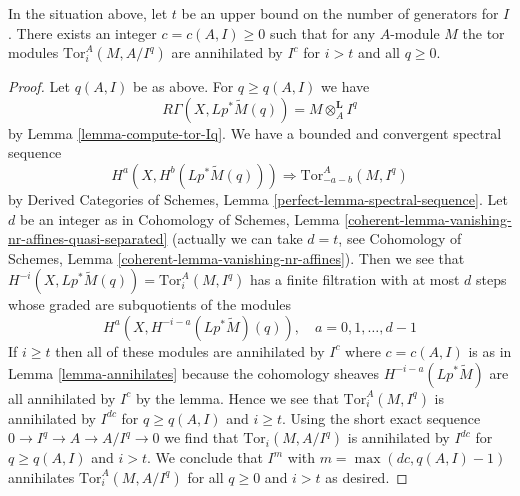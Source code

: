\begin{lemma}
\label{lemma-annihilates-tors}
In the situation above, let $t$ be an upper bound on the number of
generators for $I$. There exists an integer $c = c(A, I) \geq 0$
such that for any $A$-module $M$ the tor modules
$\text{Tor}_i^A(M, A/I^q)$ are annihilated by $I^c$ for $i > t$
and all $q \geq 0$.
\end{lemma}

\begin{proof}
Let $q(A, I)$ be as above. For $q \geq q(A, I)$ we have
$$
R\Gamma(X, Lp^*\widetilde{M}(q)) = M \otimes_A^\mathbf{L} I^q
$$
by Lemma \ref{lemma-compute-tor-Iq}.
We have a bounded and convergent spectral sequence
$$
H^a(X, H^b(Lp^*\widetilde{M}(q))) \Rightarrow
\text{Tor}_{-a - b}^A(M, I^q)
$$
by Derived Categories of Schemes, Lemma \ref{perfect-lemma-spectral-sequence}.
Let $d$ be an integer as in Cohomology of Schemes, Lemma
\ref{coherent-lemma-vanishing-nr-affines-quasi-separated}
(actually we can take $d = t$, see
Cohomology of Schemes, Lemma \ref{coherent-lemma-vanishing-nr-affines}).
Then we see that $H^{-i}(X, Lp^*\widetilde{M}(q)) = \text{Tor}_i^A(M, I^q)$
has a finite filtration with at most $d$ steps whose graded are
subquotients of the modules
$$
H^a(X, H^{- i - a}(Lp^*\widetilde{M})(q)),\quad
a = 0, 1, \ldots, d - 1
$$
If $i \geq t$ then all of these modules are annihilated
by $I^c$ where $c = c(A, I)$ is as in Lemma \ref{lemma-annihilates}
because the cohomology sheaves $H^{- i - a}(Lp^*\widetilde{M})$
are all annihilated by $I^c$ by the lemma. Hence we see that
$\text{Tor}_i^A(M, I^q)$ is annihilated by $I^{dc}$ for
$q \geq q(A, I)$ and $i \geq t$. Using the short exact sequence
$0 \to I^q \to A \to A/I^q \to 0$ we find that
$\text{Tor}_i(M, A/I^q)$ is annihilated by $I^{dc}$ for $q \geq q(A, I)$
and $i > t$. We conclude that $I^m$ with $m = \max(dc, q(A, I) - 1)$
annihilates $\text{Tor}_i^A(M, A/I^q)$ for all $q \geq 0$
and $i > t$ as desired.
\end{proof}